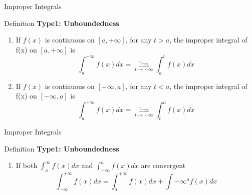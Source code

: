 \documentclass{beamer}
\begin{document}
\begin{frame}{Improper Integrals}
\begin{block}{Definition}
\textbf{Type1: Unboundedness}
    \begin{enumerate}
    
        \item If $f(x)$ is continuous on $[a,+\infty]$, for any $t>a$, the improper integral of f(x) on $[a,+\infty]$ is
    \begin{equation*}
        \int_a^{+\infty} f(x)dx = \lim_{t\rightarrow +\infty}\int_{a}^{t}f(x)dx
     \end{equation*}
    
    \item If $f(x)$ is continuous on $[-\infty, a]$, for any $t<a$, the improper integral of f(x) on $[-\infty, a]$ is
    \begin{equation*}
        \int_a^{+\infty} f(x)dx = \lim_{t\rightarrow -\infty}\int_{t}^{a}f(x)dx
     \end{equation*}
     
     
     
    \end{enumerate}
\end{block}
\end{frame}

\begin{frame}{Improper Integrals}
\begin{block}{Definition}
\textbf{Type1: Unboundedness}
    \begin{enumerate}[3]
     \item If both $\int_a^{\infty}f(x)dx$ and $\int_{-\infty}^{a}f(x)dx$ are convergent
    \begin{equation*}
        \int_{-\infty}^{+\infty} f(x)dx = \int_a^{+\infty} f(x)dx + \int{-\infty}^{a} f(x)dx
     \end{equation*}
     
    \end{enumerate}
\end{block}
\end{frame}
\end{document}
